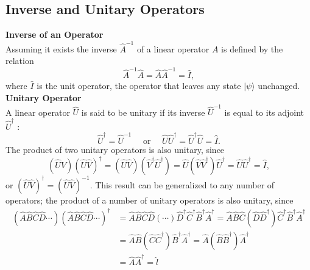 \subsection{Inverse and Unitary Operators}
\textbf{Inverse of an Operator}\\
 Assuming it exists the inverse $\hat{A}^{-1}$ of a linear operator $A$ is defined by the relation
$$
\hat{A}^{-1} \hat{A}=\hat{A} \hat{A}^{-1}=\hat{I},
$$
where $\hat{I}$ is the unit operator, the operator that leaves any state $|\psi\rangle$ unchanged.\\
\textbf{Unitary Operator}\\
 A linear operator $\hat{U}$ is said to be unitary if its inverse $\hat{U}^{-1}$ is equal to its adjoint $\hat{U}^{\dagger}$ :
$$
\hat{U}^{\dagger}=\hat{U}^{-1} \quad \text { or } \quad \hat{U} \hat{U}^{\dagger}=\hat{U}^{\dagger} \hat{U}=\hat{I} .
$$
The product of two unitary operators is also unitary, since
$$
(\hat{U} \hat{V})(\hat{U} \hat{V})^{\dagger}=(\hat{U} \hat{V})\left(\hat{V}^{\dagger} \hat{U}^{\dagger}\right)=\hat{U}\left(\hat{V} \hat{V}^{\dagger}\right) \hat{U}^{\dagger}=\hat{U} \hat{U}^{\dagger}=\hat{I},
$$
or $(\hat{U} \hat{V})^{\dagger}=(\hat{U} \hat{V})^{-1}$. This result can be generalized to any number of operators; the product of a number of unitary operators is also unitary, since
$$
\begin{aligned}
(\hat{A} \hat{B} \hat{C} \hat{D} \cdots)(\hat{A} \hat{B} \hat{C} \hat{D} \cdots)^{\dagger} &=\hat{A} \hat{B} \hat{C} \hat{D}(\cdots) \hat{D}^{\dagger} \hat{C}^{\dagger} \hat{B}^{\dagger} \hat{A}^{\dagger}=\hat{A} \hat{B} \hat{C}\left(\hat{D} \hat{D}^{\dagger}\right) \hat{C}^{\dagger} \hat{B}^{\dagger} \hat{A}^{\dagger} \\
&=\hat{A} \hat{B}\left(\hat{C} \hat{C}^{\dagger}\right) \hat{B}^{\dagger} \hat{A}^{\dagger}=\hat{A}\left(\hat{B} \hat{B}^{\dagger}\right) \hat{A}^{\dagger} \\
&=\hat{A} \hat{A}^{\dagger}=\hat{l}
\end{aligned}
$$
